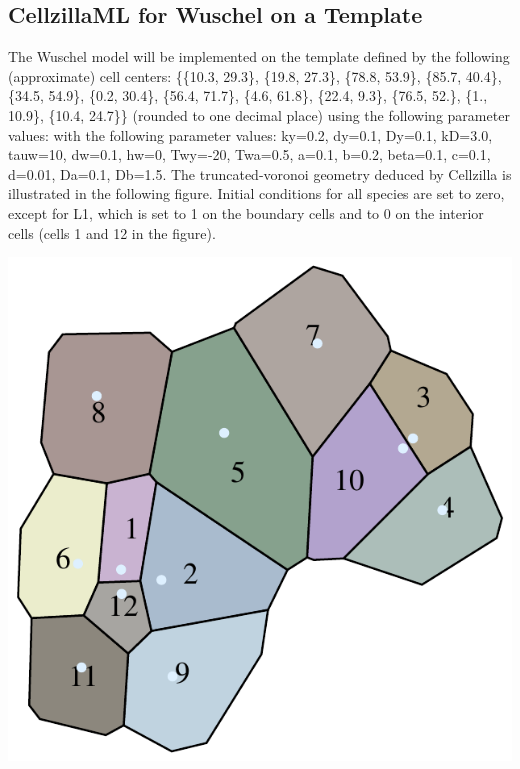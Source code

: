 \documentclass[12pt,letterpaper]{article}
\begin{document}
\subsection{CellzillaML for Wuschel on a Template}
The Wuschel model will be implemented on the template defined by the following (approximate) cell centers: 
\{\{10.3, 29.3\}, \{19.8, 27.3\}, \{78.8, 53.9\}, \{85.7, 40.4\}, \{34.5, 
  54.9\}, \{0.2, 30.4\}, \{56.4, 71.7\}, \{4.6, 61.8\}, \{22.4, 9.3\}, \{76.5, 
  52.\}, \{1., 10.9\}, \{10.4, 24.7\}\} (rounded to one decimal place) using the following parameter values: with the following parameter values: ky=0.2, dy=0.1, Dy=0.1, kD=3.0, tauw=10, dw=0.1, 
 hw=0, Twy=-20, Twa=0.5, a=0.1, b=0.2, beta=0.1, 
 c=0.1, d=0.01, Da=0.1, Db=1.5. The truncated-voronoi geometry deduced by Cellzilla is illustrated in the following figure. Initial conditions for all species are set to zero, except for L1, which is set to 1 on the boundary cells and to 0 on the interior cells (cells 1 and 12 in the figure).  
  \begin{center}
\includegraphics[scale=.7]{template.pdf}
\end{center}
\end{document}
